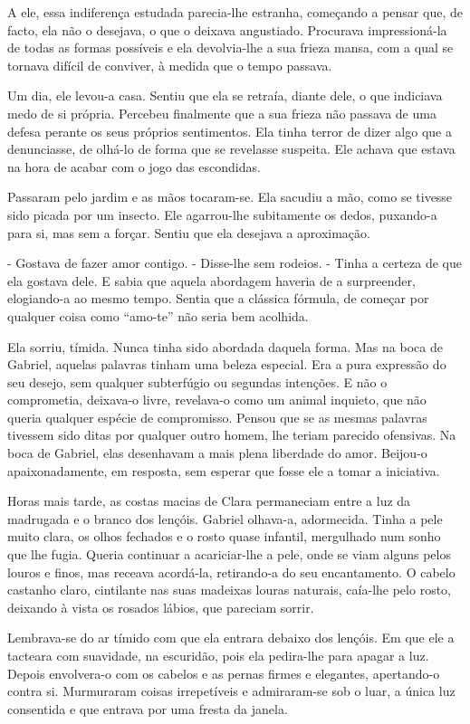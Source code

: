 A ele, essa indiferença estudada parecia-lhe estranha, começando a
pensar que, de facto, ela não o desejava, o que o deixava angustiado.
Procurava impressioná-la de todas as formas possíveis e ela devolvia-lhe
a sua frieza mansa, com a qual se tornava difícil de conviver, à medida
que o tempo passava.

Um dia, ele levou-a casa. Sentiu que ela se retraía, diante dele, o que
indiciava medo de si própria. Percebeu finalmente que a sua frieza não
passava de uma defesa perante os seus próprios sentimentos. Ela tinha
terror de dizer algo que a denunciasse, de olhá-lo de forma que se
revelasse suspeita. Ele achava que estava na hora de acabar com o jogo
das escondidas.

Passaram pelo jardim e as mãos tocaram-se. Ela sacudiu a mão, como se
tivesse sido picada por um insecto. Ele agarrou-lhe subitamente os
dedos, puxando-a para si, mas sem a forçar. Sentiu que ela desejava a
aproximação.

- Gostava de fazer amor contigo. - Disse-lhe sem rodeios. - Tinha a
certeza de que ela gostava dele. E sabia que aquela abordagem haveria de
a surpreender, elogiando-a ao mesmo tempo. Sentia que a clássica
fórmula, de começar por qualquer coisa como ``amo-te'' não seria bem
acolhida.

Ela sorriu, tímida. Nunca tinha sido abordada daquela forma. Mas na boca
de Gabriel, aquelas palavras tinham uma beleza especial. Era a pura
expressão do seu desejo, sem qualquer subterfúgio ou segundas intenções.
E não o comprometia, deixava-o livre, revelava-o como um animal
inquieto, que não queria qualquer espécie de compromisso. Pensou que se
as mesmas palavras tivessem sido ditas por qualquer outro homem, lhe
teriam parecido ofensivas. Na boca de Gabriel, elas desenhavam a mais
plena liberdade do amor. Beijou-o apaixonadamente, em resposta, sem
esperar que fosse ele a tomar a iniciativa.

Horas mais tarde, as costas macias de Clara permaneciam entre a luz da
madrugada e o branco dos lençóis. Gabriel olhava-a, adormecida. Tinha a
pele muito clara, os olhos fechados e o rosto quase infantil, mergulhado
num sonho que lhe fugia. Queria continuar a acariciar-lhe a pele, onde
se viam alguns pelos louros e finos, mas receava acordá-la, retirando-a
do seu encantamento. O cabelo castanho claro, cintilante nas suas
madeixas louras naturais, caía-lhe pelo rosto, deixando à vista os
rosados lábios, que pareciam sorrir.

Lembrava-se do ar tímido com que ela entrara debaixo dos lençóis. Em que
ele a tacteara com suavidade, na escuridão, pois ela pedira-lhe para
apagar a luz. Depois envolvera-o com os cabelos e as pernas firmes e
elegantes, apertando-o contra si. Murmuraram coisas irrepetíveis e
admiraram-se sob o luar, a única luz consentida e que entrava por uma
fresta da janela.

